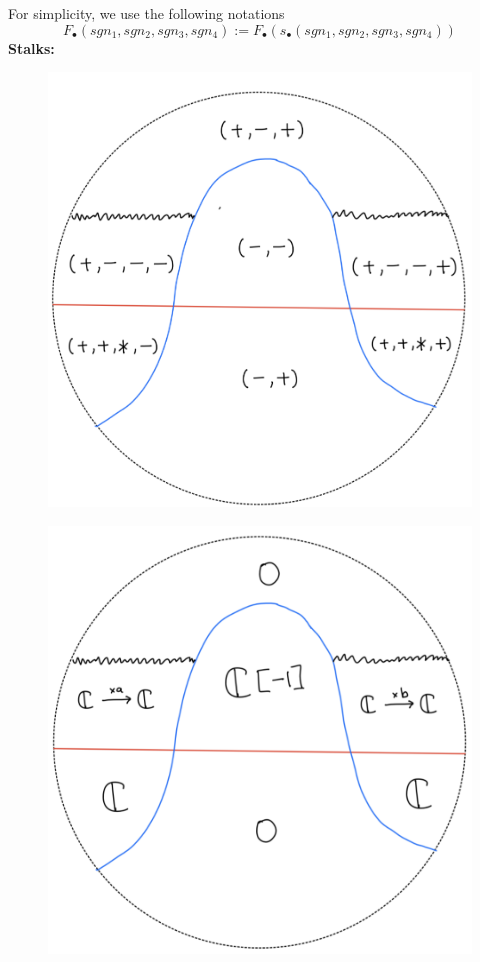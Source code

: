 For simplicity, we use the following notations
\[
F_\bullet(sgn_1,sgn_2,sgn_3,sgn_4):=F_\bullet(s_\bullet(sgn_1,sgn_2,sgn_3,sgn_4))
\]
\textbf{Stalks:}
\begin{figure}[H]
    \centering
    \includegraphics[scale = 0.45]{diagrams/lemma2/30.png} 
    \caption{}
    \label{fig:your-label}
\end{figure}
\begin{figure}[H]
    \centering
    \includegraphics[scale = 0.45]{diagrams/lemma2/31.png} 
    \caption{}
    \label{fig:your-label}
\end{figure}
